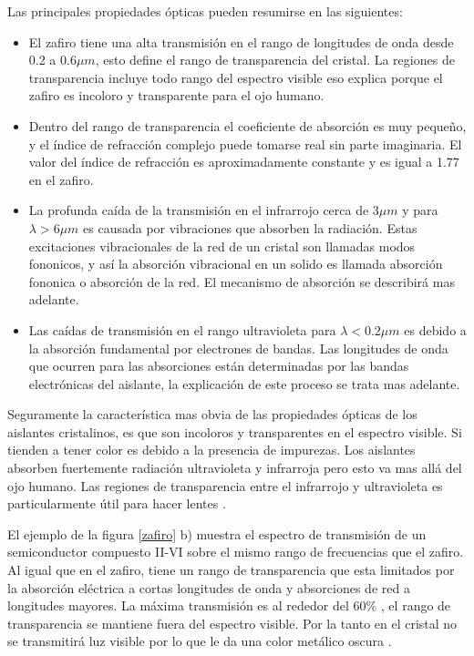 \documentclass[a4paper,openright,12pt]{book}
\begin{document}
Las principales propiedades ópticas pueden resumirse en las siguientes:
\begin{itemize}
\item El zafiro tiene una alta transmisión en el rango de longitudes de onda desde 0.2 a 0.6$\mu m$, esto define el rango de transparencia del cristal. La regiones de transparencia incluye todo rango del espectro visible eso explica porque el zafiro es incoloro y transparente para el ojo humano.
\item Dentro del rango de transparencia el coeficiente de absorción es muy pequeño, y el índice de refracción complejo puede tomarse real sin parte imaginaria. El valor del índice de refracción es aproximadamente constante y es igual a 1.77 en el zafiro.
\item La profunda caída de la transmisión en el infrarrojo cerca de 3$\mu m$ y para $\lambda >6\mu m$ es causada por vibraciones que absorben la radiación. Estas excitaciones vibracionales de la red de un cristal son llamadas modos fononicos, y así la absorción vibracional en un solido es llamada absorción fononica o absorción de la red. El mecanismo de absorción se describirá mas adelante.
\item Las caídas de transmisión en el rango ultravioleta para $\lambda<0.2\mu m$ es debido a la absorción fundamental por electrones de bandas. Las longitudes de onda que ocurren para las absorciones están determinadas por las bandas electrónicas del aislante, la explicación de este proceso se trata mas adelante.
\end{itemize}

Seguramente la característica mas obvia de las propiedades ópticas de los aislantes cristalinos, es que son incoloros y transparentes en el espectro visible. Si tienden a tener color es debido a la presencia de impurezas. Los aislantes absorben fuertemente radiación ultravioleta y infrarroja pero esto va mas allá del ojo humano. Las regiones de transparencia entre el infrarrojo y ultravioleta es particularmente útil para hacer lentes \cite{SolidStatePhysics}.

El ejemplo de la figura \ref{zafiro} b) muestra el espectro de transmisión de un semiconductor compuesto II-VI sobre el mismo rango de frecuencias que el zafiro. Al igual que en el zafiro, tiene un rango de transparencia que esta limitados por la absorción eléctrica a cortas longitudes de onda y absorciones de red a longitudes mayores. La máxima transmisión es al rededor del $60\%$ ,  el rango de transparencia se mantiene fuera del espectro visible. Por la tanto en el cristal no se transmitirá luz visible por lo que le da una color metálico oscura \cite{MarkFox}.
\end{document}
